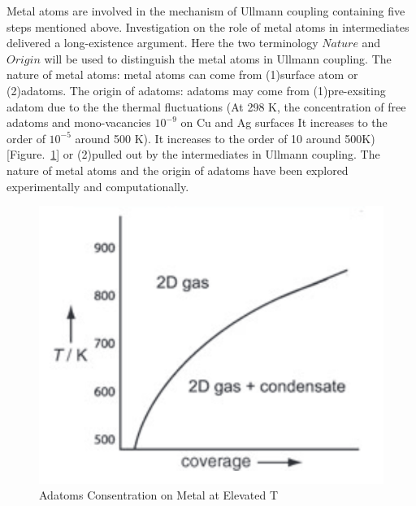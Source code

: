 \documentclass[aps,reprint,amsmath,amssymb]{revtex4-2}
\begin{document}
Metal atoms are involved in the mechanism of Ullmann coupling containing five steps mentioned above. Investigation on the role of metal atoms in intermediates delivered a long-existence argument.
Here the two terminology $Nature$ and $Origin$ will be used to distinguish the metal atoms in Ullmann coupling.
The nature of metal atoms: metal atoms can come from (1)surface atom or (2)adatoms.
The origin of adatoms: adatoms may come from (1)pre-exsiting adatom due to the the thermal fluctuations (At 298 K, the concentration of free adatoms and mono-vacancies $10^{-9}$ on Cu and Ag surfaces It increases to the order of $10^{-5}$ around 500 K). It increases to the order of 10 around 500K)[Figure.~\ref{fig:2D-gas}] or (2)pulled out by the intermediates in Ullmann coupling. The nature of metal atoms and the origin of adatoms have been explored experimentally and computationally.

\begin{figure}[ht]
\centering
\includegraphics[width=0.98\columnwidth]{Fig/2D-gas.png}
\caption{Adatoms Consentration on Metal at Elevated T}
\label{fig:2D-gas}
\end{figure}
\end{document}
